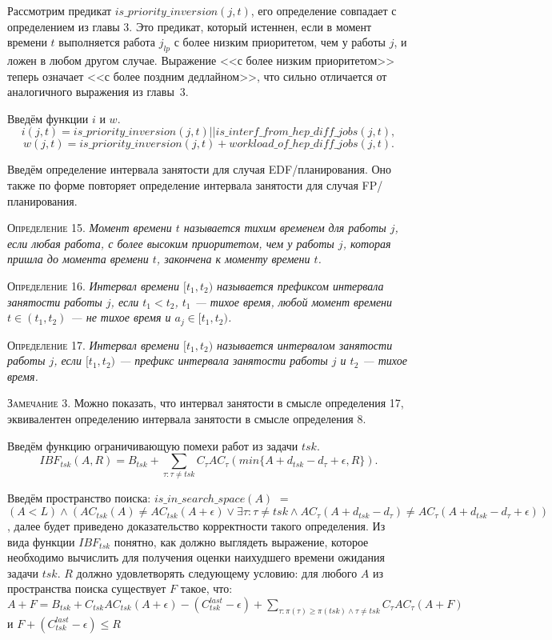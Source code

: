 \documentclass[14pt]{matmex-diploma-custom}
\begin{document}
Рассмотрим предикат $is\_priority\_inversion(j, t)$, его определение совпадает с определением 
  из главы 3. Это предикат, который истеннен, если в момент времени $t$ выполняется 
  работа $j_{lp}$ с более низким приоритетом, чем у работы $j$, и ложен в любом другом случае.
  Выражение <<с более низким приоритетом>> теперь означает <<с более поздним дедлайном>>, 
  что сильно отличается от аналогичного выражения из главы~3.
 
Введём функции $i$ и $w$. 
  $$ i(j,t) = is\_priority\_inversion(j, t) || is\_interf\_from\_hep\_diff\_jobs(j,t), $$
  $$ w(j,t) = is\_priority\_inversion(j, t) + workload\_of\_hep\_diff\_jobs(j,t).$$ 

Введём определение интервала занятости для случая EDF\-/планирования. Оно также 
  по форме повторяет определение интервала занятости для случая FP\-/планирования.

\textsc{Определение 15.}
\textit{Момент времени $t$ называется тихим временем для работы $j$, если 
  любая работа, с более высоким приоритетом, чем у работы $j$, 
  которая пришла до момента времени $t$, закончена к моменту времени $t$. }

\textsc{Определение 16.}
\textit{Интервал времени $[t_1, t_2)$ называется префиксом интервала занятости работы $j$, 
  если $t_1 < t_2$, $t_1$ --- тихое время, любой момент времени $t \in (t_1, t_2)$ --- не тихое время и 
  $a_{j} \in [t_1, t_2)$. }

\textsc{Определение 17.}
\textit{Интервал времени $[t_1, t_2)$ называется интервалом занятости работы $j$, 
  если $[t_1, t_2)$ --- префикс интервала занятости работы $j$ и $t_2$ --- тихое время. }

\textsc{Замечание 3.} Можно показать, что интервал занятости в смысле определения 17, 
  эквивалентен определению интервала занятости в смысле определения 8.

Введём функцию ограничивающую помехи работ из задачи $tsk$. 
  $$IBF_{tsk}(A, R) = B_{tsk} + \sum_{\tau:\tau \neq tsk} C_{\tau}AC_{\tau}( min\{A + d_{tsk} - d_{\tau} + \epsilon, R\} ).$$

Введём пространство поиска: $is\_in\_search\_space(A)$ $=$
    $(A < L) \wedge 
      (AC_{tsk}(A) \neq AC_{tsk}(A + \epsilon) 
       \vee \exists \tau: \tau \neq tsk \wedge AC_{\tau}(A + d_{tsk} - d_{\tau}) \neq 
                                               AC_{\tau}(A + d_{tsk} - d_{\tau} + \epsilon) )$, 
  далее будет приведено доказательство корректности такого определения. 
  Из вида функции $IBF_{tsk}$ понятно, как должно выглядеть выражение, которое необходимо 
  вычислить для получения оценки наихудшего времени ожидания задачи $tsk$. 
  $R$ должно удовлетворять следующему условию: для любого $A$ из пространства поиска 
  существует $F$ такое, что: $A + F = B_{tsk} +  C_{tsk}AC_{tsk}(A + \epsilon) - (C_{tsk}^{last} - \epsilon) + 
    \sum_{\tau:\pi(\tau) \geq \pi(tsk) \wedge \tau \neq tsk} C_{\tau}AC_{\tau}(A+F)$ и $F + (C_{tsk}^{last} - \epsilon) \leq R$
\end{document}
